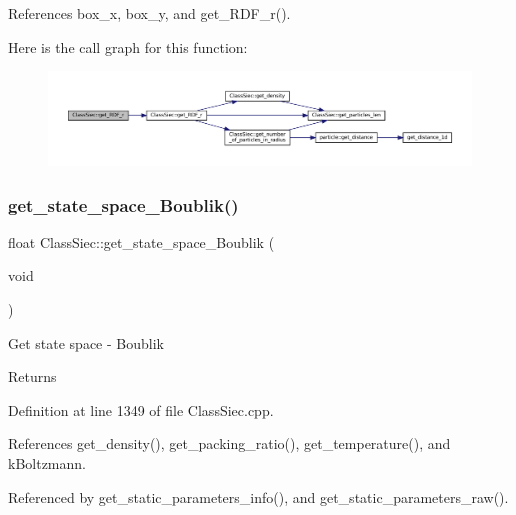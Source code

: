 References box\+\_\+x, box\+\_\+y, and get\+\_\+\+R\+D\+F\+\_\+r().

Here is the call graph for this function\+:
\nopagebreak
\begin{figure}[H]
\begin{center}
\leavevmode
\includegraphics[width=350pt]{classClassSiec_aad7c55f1dfa1b5bca25fc39e0b509304_cgraph}
\end{center}
\end{figure}
\mbox{\label{classClassSiec_a8fb2e1fa04229aaa6027fed8dd996aea}} 
\subsubsection{\texorpdfstring{get\+\_\+state\+\_\+space\+\_\+\+Boublik()}{get\_state\_space\_Boublik()}}
{\footnotesize\ttfamily float Class\+Siec\+::get\+\_\+state\+\_\+space\+\_\+\+Boublik (\begin{DoxyParamCaption}\item[{void}]{ }\end{DoxyParamCaption})}

Get state space -\/ Boublik \begin{DoxyReturn}{Returns}

\end{DoxyReturn}


Definition at line 1349 of file Class\+Siec.\+cpp.



References get\+\_\+density(), get\+\_\+packing\+\_\+ratio(), get\+\_\+temperature(), and k\+Boltzmann.



Referenced by get\+\_\+static\+\_\+parameters\+\_\+info(), and get\+\_\+static\+\_\+parameters\+\_\+raw().

